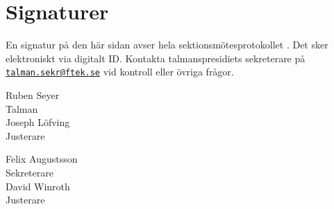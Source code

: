 \documentclass[hidelinks]{../sektionsmote} %
\begin{document}
\clearpage
\section*{Signaturer}
En signatur på den här sidan avser hela sektionsmötesprotokollet \themote. Det sker elektroniskt via digitalt ID. Kontakta talmanspresidiets sekreterare på \href{mailto:talman.sekr@ftek.se}{\texttt{talman.sekr@ftek.se}} vid kontroll eller övriga frågor. 

\vspace{4cm}

\begin{minipage}{0.45\textwidth}
    \begin{center}
        \footnotesize Ruben Seyer\\ %
        Talman\\[3cm]
        \footnotesize Joseph Löfving\\ %
        Justerare
        \end{center}
        \end{minipage}
        \begin{minipage}{0.45\textwidth}
        \begin{center}
        \footnotesize Felix Augustsson\\ %
        Sekreterare\\[3cm]
        \footnotesize David Winroth\\ %
        Justerare
    \end{center}
\end{minipage}
\end{document}
